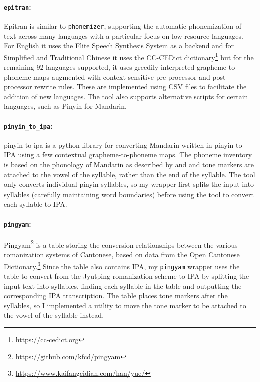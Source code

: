 \paragraph{\texttt{epitran}:}
Epitran \citep{Mortensen-et-al:2018} is similar to \texttt{phonemizer}, supporting the automatic phonemization of text across many languages with a particular focus on low-resource languages. For English it uses the Flite Speech Synthesis System \citep{black2001flite} as a backend and for Simplified and Traditional Chinese it uses the CC-CEDict dictionary\footnote{\url{https://cc-cedict.org}} but for the remaining 92 languages supported, it uses greedily-interpreted grapheme-to-phoneme maps augmented with context-sensitive pre-processor and post-processor rewrite rules. These are implemented using CSV files to facilitate the addition of new languages. The tool also supports alternative scripts for certain languages, such as Pinyin for Mandarin.

\paragraph{\texttt{pinyin\_to\_ipa}:} pinyin-to-ipa \citep{taubert_2024_pinyin-to-ipa_2024} is a python library for converting Mandarin written in pinyin to IPA using a few contextual grapheme-to-phoneme maps. The phoneme inventory is based on the phonology of Mandarin as described by \cite{lin2007sounds} and \cite{duanmu2007phonology} and tone markers are attached to the vowel of the syllable, rather than the end of the syllable. The tool only converts individual pinyin syllables, so my wrapper first splits the input into syllables (carefully maintaining word boundaries) before using the tool to convert each syllable to IPA.

\paragraph{\texttt{pingyam}:} Pingyam\footnote{\url{https://github.com/kfcd/pingyam}} is a table storing the conversion relationships between the various romanization systems of Cantonese, based on data from the Open Cantonese Dictionary.\footnote{\url{https://www.kaifangcidian.com/han/yue/}} Since the table also contains IPA, my \texttt{pingyam} wrapper uses the table to convert from the Jyutping romanization scheme to IPA by splitting the input text into syllables, finding each syllable in the table and outputting the corresponding IPA transcription. The table places tone markers after the syllables, so I implemented a utility to move the tone marker to be attached to the vowel of the syllable instead.

